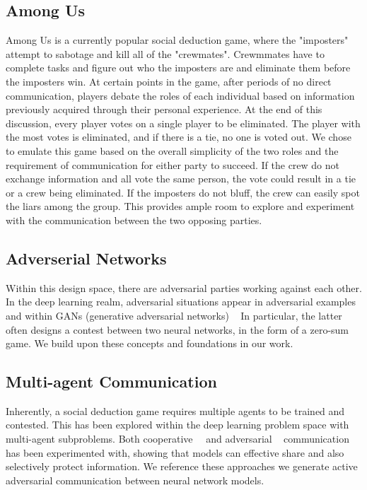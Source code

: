\documentclass[10pt,twocolumn,letterpaper]{article}
\begin{document}
\subsection{Among Us}
Among Us is a currently popular social deduction game,
where the "imposters" attempt to sabotage and kill all of the "crewmates". Crewmmates have
to complete tasks and figure out who the imposters are and eliminate them before the imposters
win.
At certain points in the game, after periods of no direct communication, players 
debate the roles of each individual based on information previously acquired through
their personal experience. At the end of this discussion, every player votes on a single
player to be eliminated. The player with the most votes is eliminated, and if there
is a tie, no one is voted out. We chose to emulate this game based on
the overall simplicity of the two roles and the requirement of communication
for either party to succeed. If the crew do not exchange information 
and all vote the same person, 
the vote could result in a tie or a crew being eliminated.
If the imposters do not bluff, the crew can easily spot the liars among the group. 
This provides ample room to explore and experiment with the communication between
the two opposing parties.
\subsection{Adverserial Networks}
Within this design space, there are adversarial parties working against each other.
In the deep learning realm, adversarial situations appear in adversarial examples~\cite{AdverserialEx} and within GANs (generative adversarial networks)
~\cite{NIPS2014_5ca3e9b1}
In particular, the latter often designs a contest between two neural networks, in the form
of a zero-sum game.
We build upon these concepts and foundations in our work.
\subsection{Multi-agent Communication}
Inherently, a social deduction game requires multiple agents to be trained and contested.
This has been explored within the deep learning problem space with multi-agent subproblems.
Both cooperative~\cite{DBLP:journals/corr/FoersterAFW16}~\cite{DBLP:journals/corr/FoersterAFW16a} 
and adversarial ~\cite{DBLP:journals/corr/AbadiA16} communication has been experimented with,
showing that models can effective share and also selectively protect information.
We reference these approaches we generate active adversarial communication between 
neural network models.
\end{document}
